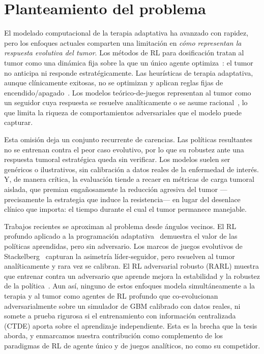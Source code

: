 \section{Planteamiento del problema}
\label{sec:problema}

El modelado computacional de la terapia adaptativa ha avanzado con rapidez, pero los enfoques actuales comparten una limitación en \emph{cómo representan la respuesta evolutiva del tumor}. Los métodos de RL para dosificación tratan al tumor como una dinámica fija sobre la que un único agente optimiza~\cite{Gallagher2024,Mashayekhi2023}: el tumor no anticipa ni responde estratégicamente. Las heurísticas de terapia adaptativa, aunque clínicamente exitosas, no se optimizan y aplican reglas fijas de encendido/apagado~\cite{Gallaher2017}. Los modelos teórico-de-juegos representan al tumor como un seguidor cuya respuesta se resuelve analíticamente o se asume racional~\cite{Stankova2019,Salvioli2024}, lo que limita la riqueza de comportamientos adversariales que el modelo puede capturar.

Esta omisión deja un conjunto recurrente de carencias. Las políticas resultantes no se entrenan contra el peor caso evolutivo, por lo que su robustez ante una respuesta tumoral estratégica queda sin verificar. Los modelos suelen ser genéricos o ilustrativos, sin calibración a datos reales de la enfermedad de interés. Y, de manera crítica, la evaluación tiende a recaer en métricas de carga tumoral aislada, que premian engañosamente la reducción agresiva del tumor ---precisamente la estrategia que induce la resistencia--- en lugar del desenlace clínico que importa: el tiempo durante el cual el tumor permanece manejable.

Trabajos recientes se aproximan al problema desde ángulos vecinos. El RL profundo aplicado a la programación adaptativa~\cite{Gallagher2024} demuestra el valor de las políticas aprendidas, pero sin adversario. Los marcos de juegos evolutivos de Stackelberg~\cite{Salvioli2024,Karima2025} capturan la asimetría líder-seguidor, pero resuelven al tumor analíticamente y rara vez se calibran. El RL adversarial robusto (RARL) muestra que entrenar contra un adversario que aprende mejora la estabilidad y la robustez de la política~\cite{Pinto2017}. Aun así, ninguno de estos enfoques modela simultáneamente a la terapia y al tumor como agentes de RL profundo que co-evolucionan adversarialmente sobre un simulador de GBM calibrado con datos reales, ni somete a prueba rigurosa si el entrenamiento con información centralizada (CTDE) aporta sobre el aprendizaje independiente. Esta es la brecha que la tesis aborda, y enmarcamos nuestra contribución como complemento de los paradigmas de RL de agente único y de juegos analíticos, no como su competidor.

